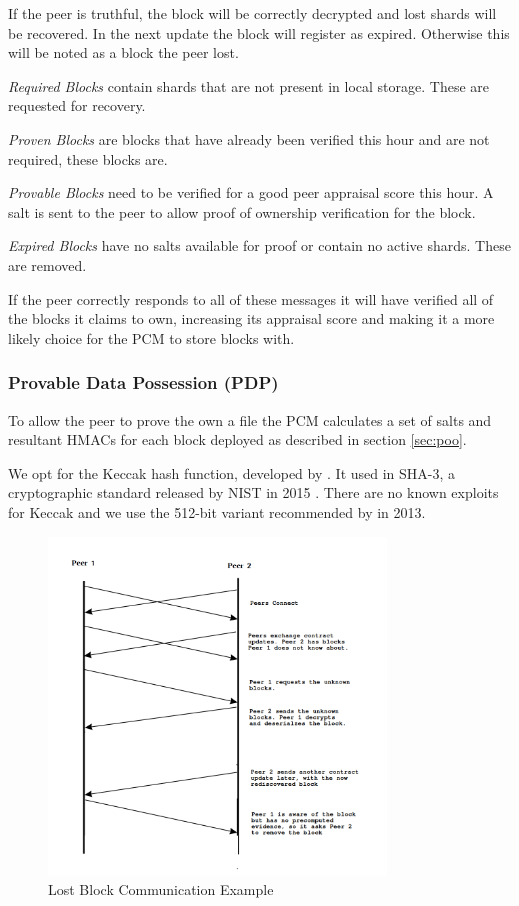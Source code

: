 \documentclass[11pt, a4paper, twoside]{report}
\begin{document}
If the peer is truthful, the block will be correctly decrypted and lost shards will be recovered. In the next update the block will register as expired. Otherwise this will be noted as a block the peer lost.

\emph{Required Blocks} contain shards that are not present in local storage. These are requested for recovery.

\emph{Proven Blocks} are blocks that have already been verified this hour and are not required, these blocks are.

\emph{Provable Blocks} need to be verified for a good peer appraisal score this hour. A salt is sent to the peer to allow proof of ownership verification for the block.

\emph{Expired Blocks} have no salts available for proof or contain no active shards. These are removed.

If the peer correctly responds to all of these messages it will have verified all of the blocks it claims to own, increasing its appraisal score and making it a more likely choice for the PCM to store blocks with.

\subsubsection{Provable Data Possession (PDP)}

To allow the peer to prove the own a file the PCM calculates a set of salts and resultant HMACs for each block deployed as described in section \ref{sec:poo}.

We opt for the Keccak hash function, developed by \cite{bertoni2009keccak}. It used in SHA-3, a cryptographic standard released by NIST in 2015 \citep{paul2015nist}. There are no known exploits for Keccak and we use the 512-bit variant recommended by \cite{bertoni2009keccak} in 2013.

\begin{figure}[ht]
 \centering
 \includegraphics[width=0.8\textwidth]{lost-block}
 \caption{Lost Block Communication Example}
 \label{fig:lost-block}
\end{figure}
\end{document}
